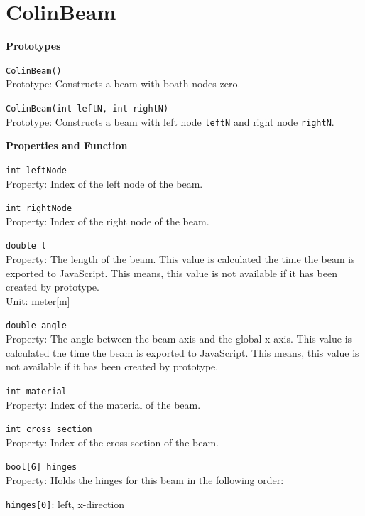 \section{ColinBeam}
\label{sec:jsColinBeam}
\begin{trivlist}
	\item[]\textbf{Prototypes}
	\begin{trivlist}
		\leftskip=1cm
		\item[] \texttt{ColinBeam()}\\ Prototype: Constructs a beam with boath nodes zero.
		\item[] \texttt{ColinBeam(int leftN, int rightN)}\\ Prototype: Constructs a beam with left node \texttt{leftN} and right node \texttt{rightN}.
	\end{trivlist}
	\item[] \textbf{Properties and Function}
	\begin{trivlist}
		\leftskip=1cm
		\item[] \texttt{int leftNode} \\Property: Index of the left node of the beam.
		\item[] \texttt{int rightNode} \\Property: Index of the right node of the beam.
		\item[] \texttt{double l} \\Property: The length of the beam. This value is calculated the time the beam is exported to JavaScript. This means, this value is not available if it has been created by prototype.\\ Unit: meter[m]
		\item[] \texttt{double angle} \\Property: The angle between the beam axis and the global x axis. This value is calculated the time the beam is exported to JavaScript. This means, this value is not available if it has been created by prototype.
		\item[] \texttt{int material} \\ Property: Index of the material of the beam.
		\item[] \texttt{int cross section} \\ Property: Index of the cross section of the beam.
		\item[] \texttt{bool[6] hinges} \\Property: Holds the hinges for this beam in the following order:
		\begin{trivlist}
			\leftskip=1cm
			\item[] \texttt{hinges[0]}: left, x-direction

\end{trivlist}
\end{trivlist}
\end{trivlist}

